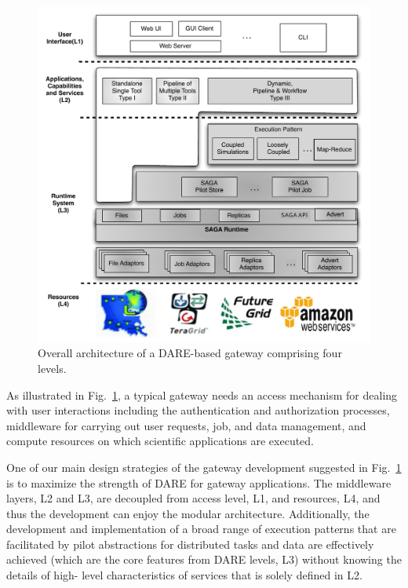 \documentclass[]{svjour3}
\begin{document}
\begin{figure}
  \centering
  \includegraphics[scale=0.55]{figures/DARE-gateway-arch.pdf}
  \caption{\small {} Overall architecture of a DARE-based gateway comprising four levels. %
  }
  \label{fig:dare-arch} 
\end{figure}


As illustrated in Fig.~\ref{fig:dare-arch}, a typical gateway needs an access mechanism for dealing with user 
interactions including the authentication and authorization processes, middleware for carrying out user requests, job, 
and data management, and compute resources on which scientific applications are executed. 

 One of
our main design strategies of the gateway development suggested in
Fig.~\ref{fig:dare-arch} is to maximize the strength of DARE for
gateway applications.  The middleware layers, L2 and L3, are decoupled
from access level, L1, and resources, L4, and thus the development can
enjoy the modular architecture. Additionally, the development and
implementation of a broad range of execution patterns that are
facilitated by pilot abstractions for distributed tasks and data are
effectively achieved (which are the core features from DARE levels,
L3) without knowing the details of high- level characteristics of
services that is solely defined in L2.
\end{document}
